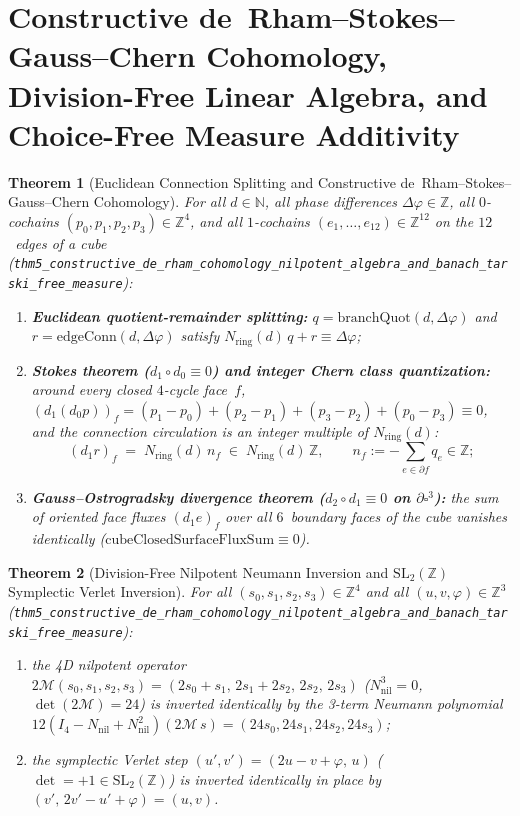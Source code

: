 \documentclass[11pt,a4paper]{article}
\theoremstyle{plain}
\newtheorem{theorem}{Theorem}[section]
\theoremstyle{definition}
\begin{document}
\section{Constructive de~Rham--Stokes--Gauss--Chern Cohomology, Division-Free Linear Algebra, and Choice-Free Measure Additivity}
\label{sec:constructive-foundations}

\begin{theorem}[Euclidean Connection Splitting and Constructive de~Rham--Stokes--Gauss--Chern Cohomology]
\label{thm:main-5}
For all $d\in\mathbb{N}$, all phase differences $\Delta\varphi\in\mathbb{Z}$, all $0$-cochains $(p_0,p_1,p_2,p_3)\in\mathbb{Z}^4$, and all $1$-cochains $(e_1,\dots,e_{12})\in\mathbb{Z}^{12}$ on the $12$~edges of a cube (\texttt{thm5\_constructive\_de\_rham\_cohomology\_nilpotent\_algebra\_and\_banach\_tarski\_free\_measure}):
\begin{enumerate}[label=\textbf{(\roman*)},leftmargin=*,noitemsep]
\item \textbf{Euclidean quotient-remainder splitting:}
  $q = \mathrm{branchQuot}(d,\Delta\varphi)$ and $r = \mathrm{edgeConn}(d,\Delta\varphi)$ satisfy $N_{\mathrm{ring}}(d)\,q + r \equiv \Delta\varphi$;
\item \textbf{Stokes theorem ($d_1\circ d_0\equiv 0$) and integer Chern class quantization:}
  around every closed $4$-cycle face~$f$, $(d_1(d_0 p))_f = (p_1-p_0)+(p_2-p_1)+(p_3-p_2)+(p_0-p_3) \equiv 0$, and the connection circulation is an integer multiple of $N_{\mathrm{ring}}(d)$:
  \[
    (d_1 r)_f \;=\; N_{\mathrm{ring}}(d)\,n_f \;\in\; N_{\mathrm{ring}}(d)\,\mathbb{Z},\qquad
    n_f := -\sum_{e\in\partial f} q_e \in \mathbb{Z};
  \]
\item \textbf{Gauss--Ostrogradsky divergence theorem ($d_2\circ d_1\equiv 0$ on $\partial\square^3$):}
  the sum of oriented face fluxes $(d_1 e)_f$ over all $6$~boundary faces of the cube vanishes identically ($\mathrm{cubeClosedSurfaceFluxSum}\equiv 0$).
\end{enumerate}
\end{theorem}

\begin{theorem}[Division-Free Nilpotent Neumann Inversion and $\mathrm{SL}_2(\mathbb{Z})$ Symplectic Verlet Inversion]
\label{thm:main-5b}
For all $(s_0,s_1,s_2,s_3)\in\mathbb{Z}^4$ and all $(u,v,\varphi)\in\mathbb{Z}^3$ (\texttt{thm5\_constructive\_de\_rham\_cohomology\_nilpotent\_algebra\_and\_banach\_tarski\_free\_measure}):
\begin{enumerate}[label=\textbf{(\roman*)},leftmargin=*,noitemsep]
\item the 4D nilpotent operator $2\mathcal{M}(s_0,s_1,s_2,s_3) = (2s_0+s_1,\,2s_1+2s_2,\,2s_2,\,2s_3)$ ($N_{\mathrm{nil}}^3 = 0$, $\det(2\mathcal{M})=24$) is inverted identically by the 3-term Neumann polynomial $12(I_4 - N_{\mathrm{nil}} + N_{\mathrm{nil}}^2)(2\mathcal{M}\,s) = (24s_0,24s_1,24s_2,24s_3)$;
\item the symplectic Verlet step $(u',v') = (2u-v+\varphi,\,u)$ ($\det = +1\in\mathrm{SL}_2(\mathbb{Z})$) is inverted identically in place by $(v',\,2v'-u'+\varphi) = (u,v)$.
\end{enumerate}
\end{theorem}
\end{document}
